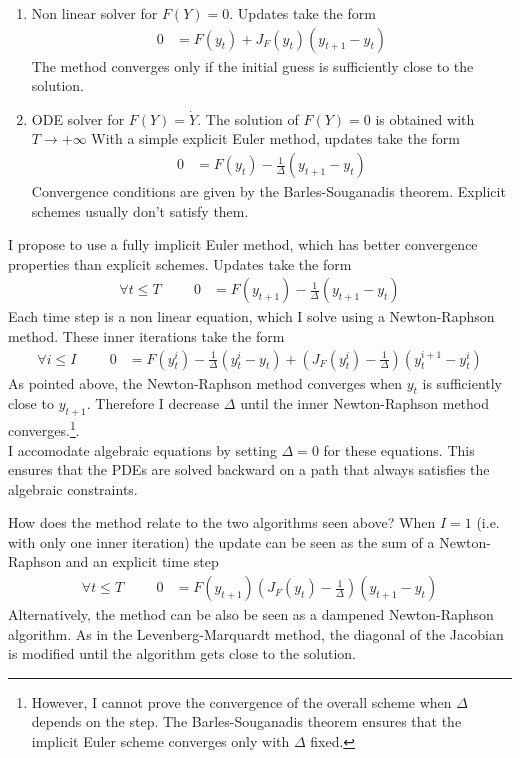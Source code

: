 \documentclass[english]{article}
\begin{document}
\begin{enumerate}
	\item Non linear solver for $F (Y ) = 0$. Updates take the form
	\begin{align*}
		0 &= F(y_{t}) + J_{F}(y_t) (y_{t+1} - y_t)
	\end{align*}
	The method converges only if the initial guess is sufficiently close to the solution. 
	\item ODE solver for $F(Y) = \dot{Y}$. The solution of $F(Y)=0$ is obtained with $T\rightarrow +\infty$
	With a simple explicit Euler method, updates take the form
	\begin{align*}
		0&= F(y_t) - \frac{1}{\Delta} (y_{t+1} -y_{t})
	\end{align*}
	Convergence conditions are given by the Barles-Souganadis theorem. Explicit schemes usually don't satisfy them.
\end{enumerate}
I propose to use a fully implicit Euler method, which has better convergence properties than explicit schemes.  Updates take the form 
\begin{align*}
	\forall t \leq T \hspace{1cm} 0&= F(y_{t+1}) - \frac{1}{\Delta}(y_{t+1} -y_{t})
\end{align*}
Each time step is a non linear equation, which I solve using a Newton-Raphson method. These inner iterations take the form
\begin{align*}
	\forall i \leq I \hspace{1cm}	0 &= F(y_{t}^i) - \frac{1}{\Delta}(y_{t}^{i} -y_{t}) + (J_{F}(y_t^i) -  \frac{1}{\Delta})(y^{i+1}_{t} - y_t^i)
\end{align*}
As pointed above, the Newton-Raphson method converges when $y_t$ is sufficiently close to $y_{t+1}$. Therefore I decrease $\Delta$ until the inner Newton-Raphson method converges.\footnote{However, I cannot prove the convergence of the overall scheme when $\Delta$ depends on the step. The Barles-Souganadis theorem ensures that the implicit Euler scheme converges only with $\Delta$ fixed. }.\\
I accomodate algebraic equations by setting $\Delta = 0$ for these equations. This ensures that the PDEs are solved backward on a path that always satisfies the algebraic constraints.

How does the method relate to the two algorithms seen above? When $I =1$ (i.e. with only one inner iteration) the update can be seen as the sum of a Newton-Raphson and an explicit time step
\begin{align*}
	\forall t \leq T \hspace{1cm} 0&= F(y_{t+1}) (J_{F}(y_t) - \frac{1}{\Delta})(y_{t+1} -y_{t})
\end{align*}
Alternatively, the method can be also be seen as a dampened Newton-Raphson algorithm. As in the Levenberg-Marquardt method, the diagonal of the Jacobian is modified until the algorithm gets close to the solution.
\end{document}

